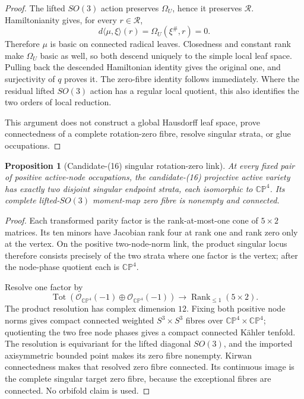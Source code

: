 \documentclass[11pt]{article}
\newtheorem{proposition}[theorem]{Proposition}
\theoremstyle{definition}
\theoremstyle{remark}
\begin{document}
\begin{proof}
The lifted \(SO(3)\) action preserves \(\Omega_U\), hence it preserves
\(\mathcal R\).  Hamiltonianity gives, for every \(r\in\mathcal R\),
\[
 d\langle\mu,\xi\rangle(r)
 =\Omega_U(\xi^\#,r)=0.
\]
Therefore \(\mu\) is basic on connected radical leaves.  Closedness and
constant rank make \(\Omega_U\) basic as well, so both descend uniquely to
the simple local leaf space.  Pulling back the descended Hamiltonian
identity gives the original one, and surjectivity of \(q\) proves it.
The zero-fibre identity follows immediately.  Where the residual lifted
\(SO(3)\) action has a regular local quotient, this also identifies the two
orders of local reduction.

This argument does not construct a global Hausdorff leaf space, prove
connectedness of a complete rotation-zero fibre, resolve singular strata,
or glue occupations.
\end{proof}

\begin{proposition}[Candidate-(16) singular rotation-zero link]
\label{prop:candidate-16-singular-rotation-link}
At every fixed pair of positive active-node occupations, the candidate-(16)
projective active variety has exactly two disjoint singular endpoint strata,
each isomorphic to \(\mathbb{CP}^4\).  Its complete lifted-\(SO(3)\)
moment-map zero fibre is nonempty and connected.
\end{proposition}

\begin{proof}
Each transformed parity factor is the rank-at-most-one cone of \(5\times2\)
matrices.  Its ten minors have Jacobian rank four at rank one and rank zero
only at the vertex.  On the positive two-node-norm link, the product singular
locus therefore consists precisely of the two strata where one factor is the
vertex; after the node-phase quotient each is \(\mathbb{CP}^4\).

Resolve one factor by
\[
 \operatorname{Tot}\!\left(
 \mathcal O_{\mathbb{CP}^4}(-1)\oplus
 \mathcal O_{\mathbb{CP}^4}(-1)
 \right)
 \longrightarrow \operatorname{Rank}_{\leq1}(5\times2).
\]
The product resolution has complex dimension \(12\).  Fixing both positive
node norms gives compact connected weighted \(S^3\times S^3\) fibres over
\(\mathbb{CP}^4\times\mathbb{CP}^4\); quotienting the two free node phases
gives a compact connected K\"ahler tenfold.  The resolution is equivariant
for the lifted diagonal \(SO(3)\), and the imported axisymmetric bounded point
makes its zero fibre nonempty.  Kirwan connectedness makes that resolved zero
fibre connected.  Its continuous image is the complete singular target zero
fibre, because the exceptional fibres are connected.  No orbifold claim is
used.
\end{proof}
\end{document}
